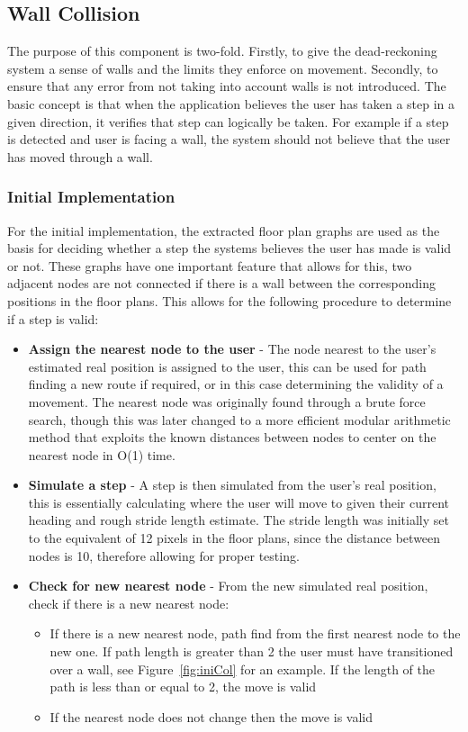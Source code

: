 \documentclass[main.tex]{subfiles}
\begin{document}
\subsection{Wall Collision}

The purpose of this component is two-fold. Firstly, to give the dead-reckoning system a sense of walls and the limits they enforce on movement. Secondly, to ensure that any error from not taking into account walls is not introduced. The basic concept is that when the application believes the user has taken a step in a given direction, it verifies that step can logically be taken. For example if a step is detected and user is facing a wall, the system should not believe that the user has moved through a wall.

\subsubsection{Initial Implementation}

For the initial implementation, the extracted floor plan graphs are used as the basis for deciding whether a step the systems believes the user has made is valid or not. These graphs have one important feature that allows for this, two adjacent nodes are not connected if there is a wall between the corresponding positions in the floor plans. This allows for the following procedure to determine if a step is valid:

\begin{itemize}
	\item \textbf{Assign the nearest node to the user} - The node nearest to the user's estimated real position is assigned to the user, this can be used for path finding a new route if required, or in this case determining the validity of a movement. The nearest node was originally found through a brute force search, though this was later changed to a more efficient modular arithmetic method that exploits the known distances between nodes to center on the nearest node in O(1) time.
	\item \textbf{Simulate a step} - A step is then simulated from the user's real position, this is essentially calculating where the user will move to given their current heading and rough stride length estimate. The stride length was initially set to the equivalent of 12 pixels in the floor plans, since the distance between nodes is 10, therefore allowing for proper testing. 
	\item \textbf{Check for new nearest node} - From the new simulated real position, check if there is a new nearest node:
	\begin{itemize}
		\item If there is a new nearest node, path find from the first nearest node to the new one. If path length is greater than 2 the user must have transitioned over a wall, see Figure~\ref{fig:iniCol} for an example. If the length of the path is less than or equal to 2, the move is valid
		\item If the nearest node does not change then the move is valid
	\end{itemize}
\end{itemize}
\end{document}
